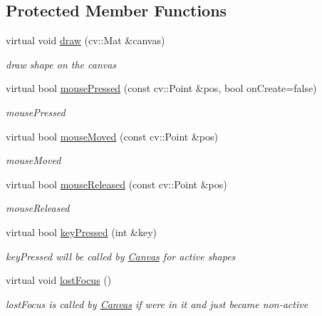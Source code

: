 \subsection*{Protected Member Functions}
\begin{DoxyCompactItemize}
\item 
virtual void \hyperlink{classcanvascv_1_1TextBox_a81bf5e2f8c85a805dfff4a401addd0bf}{draw} (cv\+::\+Mat \&canvas)
\begin{DoxyCompactList}\small\item\em draw shape on the canvas \end{DoxyCompactList}\item 
virtual bool \hyperlink{classcanvascv_1_1TextBox_adaf9422ce68a31eda4fc683ee0b74b8a}{mouse\+Pressed} (const cv\+::\+Point \&pos, bool on\+Create=false)
\begin{DoxyCompactList}\small\item\em mouse\+Pressed \end{DoxyCompactList}\item 
virtual bool \hyperlink{classcanvascv_1_1TextBox_a019cfc3fe096a51c65cc871d4e8be0b7}{mouse\+Moved} (const cv\+::\+Point \&pos)
\begin{DoxyCompactList}\small\item\em mouse\+Moved \end{DoxyCompactList}\item 
virtual bool \hyperlink{classcanvascv_1_1TextBox_ad048ee21fc55f500c6c85755d2d87aeb}{mouse\+Released} (const cv\+::\+Point \&pos)
\begin{DoxyCompactList}\small\item\em mouse\+Released \end{DoxyCompactList}\item 
virtual bool \hyperlink{classcanvascv_1_1TextBox_a4b9a7ecf58369f2161382d3c791542d7}{key\+Pressed} (int \&key)
\begin{DoxyCompactList}\small\item\em key\+Pressed will be called by \hyperlink{classcanvascv_1_1Canvas}{Canvas} for active shapes \end{DoxyCompactList}\item 
virtual void \hyperlink{classcanvascv_1_1TextBox_ab0dcb247e1aacf6d66879069d48975cd}{lost\+Focus} ()\hypertarget{classcanvascv_1_1TextBox_ab0dcb247e1aacf6d66879069d48975cd}{}\label{classcanvascv_1_1TextBox_ab0dcb247e1aacf6d66879069d48975cd}

\begin{DoxyCompactList}\small\item\em lost\+Focus is called by \hyperlink{classcanvascv_1_1Canvas}{Canvas} if we\textquotesingle{}re in it and just became non-\/active \end{DoxyCompactList}\end{DoxyCompactItemize}
